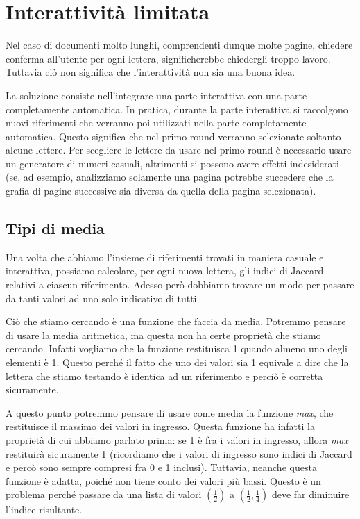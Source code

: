 \section{Interattivit\`a limitata}

Nel caso di documenti molto lunghi, comprendenti dunque molte pagine, chiedere conferma all'utente per ogni lettera, significherebbe chiedergli troppo lavoro. Tuttavia ci\`o non significa che l'interattivit\`a non sia una buona idea.

La soluzione consiste nell'integrare una parte interattiva con una parte completamente automatica. In pratica, durante la parte interattiva si raccolgono nuovi riferimenti che verranno poi utilizzati nella parte completamente automatica. Questo significa che nel primo round verranno selezionate soltanto alcune lettere. Per scegliere le lettere da usare nel primo round \`e necessario usare un generatore di numeri casuali, altrimenti si possono avere effetti indesiderati (se, ad esempio, analizziamo solamente una pagina potrebbe succedere che la grafia di pagine successive sia diversa da quella della pagina selezionata).

\subsection{Tipi di media}

Una volta che abbiamo l'insieme di riferimenti trovati in maniera casuale e interattiva, possiamo calcolare, per ogni nuova lettera, gli indici di Jaccard relativi a ciascun riferimento. Adesso per\`o dobbiamo trovare un modo per passare da tanti valori ad uno solo indicativo di tutti.

Ci\`o che stiamo cercando \`e una funzione che faccia da media. Potremmo pensare di usare la media aritmetica, ma questa non ha certe propriet\`a che stiamo cercando. Infatti vogliamo che la funzione restituisca 1 quando almeno uno degli elementi \`e 1. Questo perch\'e il fatto che uno dei valori sia 1 equivale a dire che la lettera che stiamo testando \`e identica ad un riferimento e perci\`o \`e corretta sicuramente.

A questo punto potremmo pensare di usare come media la funzione \emph{max}, che restituisce il massimo dei valori in ingresso. Questa funzione ha infatti la propriet\`a di cui abbiamo parlato prima: se 1 \`e fra i valori in ingresso, allora \emph{max} restituir\`a sicuramente 1 (ricordiamo che i valori di ingresso sono indici di Jaccard e perc\`o sono sempre compresi fra 0 e 1 inclusi). Tuttavia, neanche questa funzione \`e adatta, poich\'e non tiene conto dei valori pi\`u bassi. Questo \`e un problema perch\'e passare da una lista di valori $(\frac{1}{2})$ a $(\frac{1}{2}, \frac{1}{4})$ deve far diminuire l'indice risultante.

